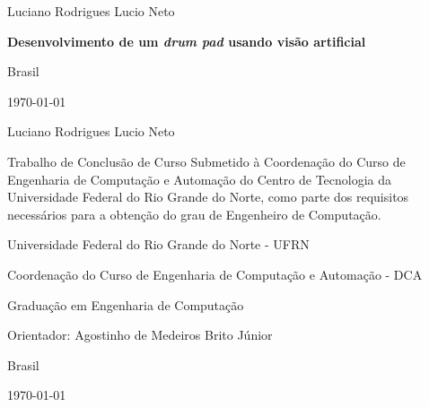 \documentclass[12pt]{report}
\def\worktitle{Desenvolvimento de um {\it drum pad} usando visão artificial}
\def\workauthor{Luciano Rodrigues Lucio Neto}
\begin{document}
\begin{titlepage}

	\centering
	{\normalsize \workauthor \par}
	\vfill
	{\Large\bfseries \worktitle \par}
	\vfill


	{\normalsize Brasil\par}
	{\normalsize \monthyeardate\today}
\end{titlepage}

\begin{titlepage}

	\centering
	{\normalsize \workauthor\par}
	\vfill
	\centering
	{\Large\bfseries \par}
	\vfill

	\begin{flushright}	
	\begin{minipage}{15em}	
  	Trabalho de Conclusão de Curso Submetido à Coordenação do Curso de Engenharia de Computação e Automação do Centro de Tecnologia da Universidade Federal do Rio Grande do Norte, como parte dos requisitos necessários para a obtenção do grau de Engenheiro de Computação.
	\end{minipage}
	\end{flushright}	
	\vfill
	
	
	{\small Universidade Federal do Rio Grande do Norte - UFRN \par}
	{\small Coordenação do Curso de Engenharia de Computação e Automação - DCA \par}
	{\small Graduação em Engenharia de Computação \par}
	\vfill
	\normalsize
	\centering
	{\normalsize Orientador: Agostinho de Medeiros Brito Júnior \par}
	\vfill
	{\normalsize Brasil\par}
	{\normalsize \monthyeardate\today}
\end{titlepage}
\end{document}
